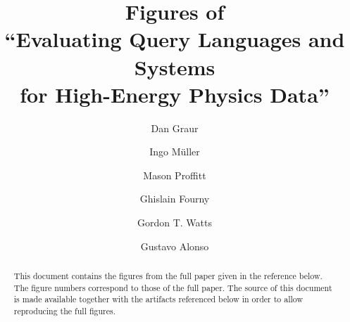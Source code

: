 \documentclass[sigconf,nonacm,natbib=false,screen]{acmart}
\begin{document}
\title[Evaluating Query Languages and Systems for High-Energy Physics Data]
      {Figures of \\ ``Evaluating Query Languages and Systems \\ for High-Energy Physics Data''}

\author{Dan Graur}

\author{Ingo Müller}

\author{Mason Proffitt}

\author{Ghislain Fourny}

\author{Gordon T. Watts}

\author{Gustavo Alonso}

\begin{abstract}
  This document contains the figures
  from the full paper given in the reference below.
  The figure numbers correspond to those of the full paper.
  The source of this document is made available
  together with the artifacts referenced below
  in order to allow reproducing the full figures.
\end{abstract}

\maketitle
\end{document}
